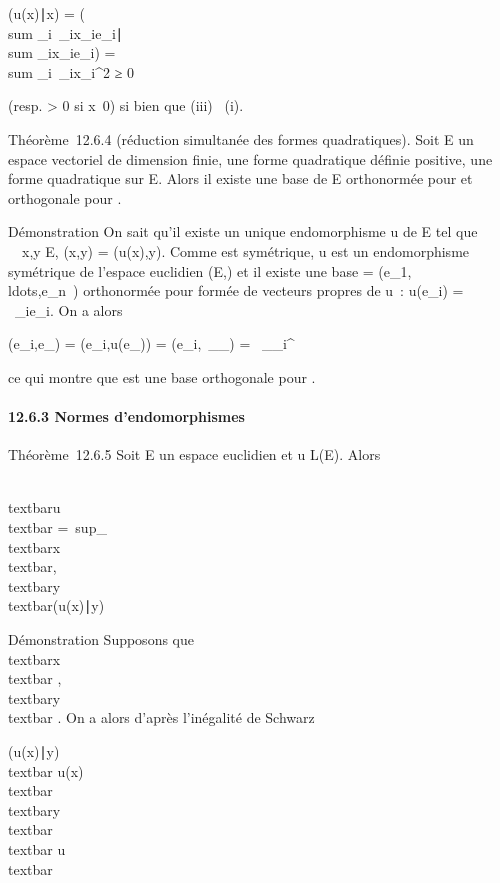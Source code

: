 \documentclass[]{article}
\begin{document}
(u(x)∣x) = (\\sum
\_i\lambda~\_ix\_ie\_i∣\\sum
\_ix\_ie\_i) = \\sum
\_i\lambda~\_ix\_i^2 ≥ 0

(resp. \textgreater{} 0 si x\neq~0) si bien que
(iii) \rigtharrow~(i).

Théorème~12.6.4 (réduction simultanée des formes quadratiques). Soit E
un ~ espace vectoriel de dimension finie, \Phi une forme quadratique
définie positive, \Psi une forme quadratique sur E. Alors il existe une
base  de E orthonormée pour \Phi et orthogonale pour \Psi.

Démonstration On sait qu'il existe un unique endomorphisme u de E tel
que \forall~~x,y \in E, \psi(x,y) = \phi(u(x),y). Comme \psi est
symétrique, u est un endomorphisme symétrique de l'espace euclidien
(E,\Phi) et il existe une base  =
(e\_1,\\ldots,e\_n~)
orthonormée pour \Phi formée de vecteurs propres de u~: u(e\_i) =
\lambda~\_ie\_i. On a alors

\psi(e\_i,e\_\jmath) = \phi(e\_i,u(e\_\jmath)) =
\phi(e\_i,\lambda~\_\jmathe\_\jmath) =
\lambda~\_\jmath\delta\_i^\jmath

ce qui montre que  est une base orthogonale pour \psi.

\paragraph{12.6.3 Normes d'endomorphismes}

Théorème~12.6.5 Soit E un espace euclidien et u \in L(E). Alors

\\textbar{}u\\textbar{}
=\
sup\_\\textbar{}x\\textbar{},\\textbar{}y\\textbar{}\textbar{}(u(x)∣y)\textbar{}

Démonstration Supposons que
\\textbar{}x\\textbar{} ,\\textbar{}y\\textbar{} . On a alors
d'après l'inégalité de Schwarz

\textbar{}(u(x)∣y)\textbar{}\leq\\textbar{}
u(x)\\textbar{}\\textbar{}y\\textbar{}
\leq\\textbar{} u\\textbar{}
\end{document}
